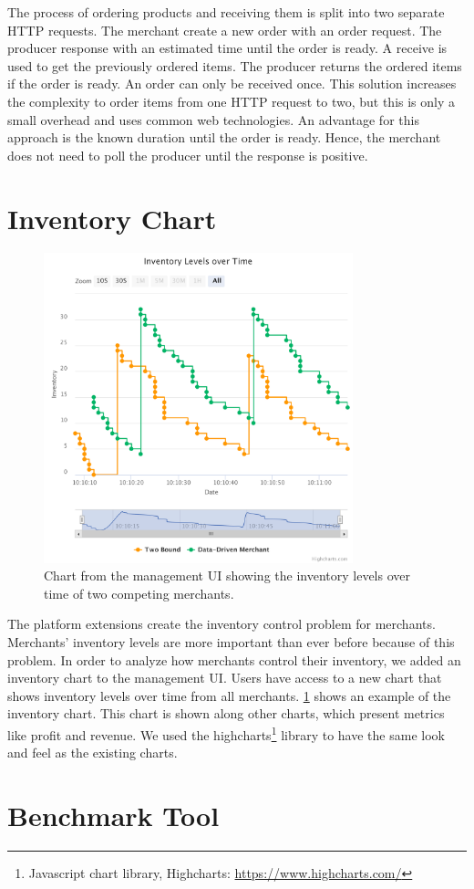 The process of ordering products and receiving them is split into two separate HTTP requests.
The merchant create a new order with an order request.
The producer response with an estimated time until the order is ready.
A receive is used to get the previously ordered items.
The producer returns the ordered items if the order is ready.
An order can only be received once.
This solution increases the complexity to order items from one HTTP request to two, but this is only a small overhead and uses common web technologies.
An advantage for this approach is the known duration until the order is ready.
Hence, the merchant does not need to poll the producer until the response is positive.

\section{Inventory Chart}
\label{section:inventory_graph}

\begin{figure}[t]
	\centering
	\includegraphics[width=0.8\textwidth]{figures/inventory_graph}
	\caption{Chart from the management UI showing the inventory levels over time of two competing merchants.}
	\label{fig:invnetory_graph}
\end{figure}

The platform extensions create the inventory control problem for merchants.
Merchants' inventory levels are more important than ever before because of this problem.
In order to analyze how merchants control their inventory, we added an inventory chart to the management UI.
Users have access to a new chart that shows inventory levels over time from all merchants.
\cref{fig:invnetory_graph} shows an example of the inventory chart.
This chart is shown along other charts, which present metrics like profit and revenue. 
We used the highcharts\footnote{Javascript chart library, Highcharts: \url{https://www.highcharts.com/}} library to have the same look and feel as the existing charts.

\section{Benchmark Tool}
\label{section:benchmark_tool}

